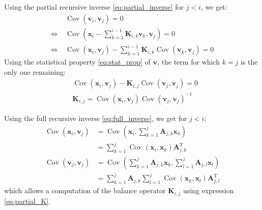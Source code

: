 \documentclass[12pt]{scrartcl}
\DeclareMathOperator{\Cov}{Cov}
\begin{document}
Using the partial recursive inverse \eqref{eq:partial_inverse} for $j < i$, we get:
\begin{align}
& \Cov\left(\mathbf{v}_i, \mathbf{v}_j\right) = 0 \nonumber \\
\Leftrightarrow \ & \Cov\left(\mathbf{x}_i - \sum_{k=1}^{i-1} \mathbf{K}_{i,k} \mathbf{v}_k, \mathbf{v}_j\right) = 0 \nonumber \\
\Leftrightarrow \ & \Cov\left(\mathbf{x}_i, \mathbf{v}_j\right) - \sum_{k=1}^{i-1} \mathbf{K}_{i,k} \Cov\left(\mathbf{v}_k, \mathbf{v}_j\right) = 0
\end{align}
Using the statistical property \eqref{eq:stat_prop} of $\mathbf{v}$, the term for which $k=j$ is the only one remaining:
\begin{align}
\label{eq:partial_K}
& \Cov\left(\mathbf{x}_i, \mathbf{v}_j\right) - \mathbf{K}_{i,j} \Cov\left(\mathbf{v}_j, \mathbf{v}_j\right) = 0 \nonumber \\
& \mathbf{K}_{i,j} = \Cov\left(\mathbf{x}_i, \mathbf{v}_j\right) \Cov\left(\mathbf{v}_j, \mathbf{v}_j\right)^{-1}
\end{align}

Using the full recursive inverse \eqref{eq:full_inverse}, we get for $j < i$:
\begin{subequations}
\begin{align}
\Cov\left(\mathbf{x}_i,\mathbf{v}_j\right) & = \Cov\left(\mathbf{x}_i,\sum_{k=1}^j \mathbf{A}_{j,k} \mathbf{x}_k\right) \nonumber \\
 & = \sum_{k=1}^j\Cov\left(\mathbf{x}_i,\mathbf{x}_k\right) \mathbf{A}_{j,k}^\mathrm{T} \\
\Cov\left(\mathbf{v}_j,\mathbf{v}_j\right) & = \Cov\left(\sum_{k=1}^j \mathbf{A}_{j,k} \mathbf{x}_k,\sum_{l=1}^j \mathbf{A}_{j,l} \mathbf{x}_l\right) \nonumber \\
 & = \sum_{k=1}^j \mathbf{A}_{j,k} \sum_{l=1}^j \Cov\left(\mathbf{x}_k,\mathbf{x}_l\right) \mathbf{A}_{j,l}^\mathrm{T}
\end{align}
\end{subequations}
which allows a computation of the balance operator $\mathbf{K}_{i,j}$ using expression \eqref{eq:partial_K}.
\end{document}

